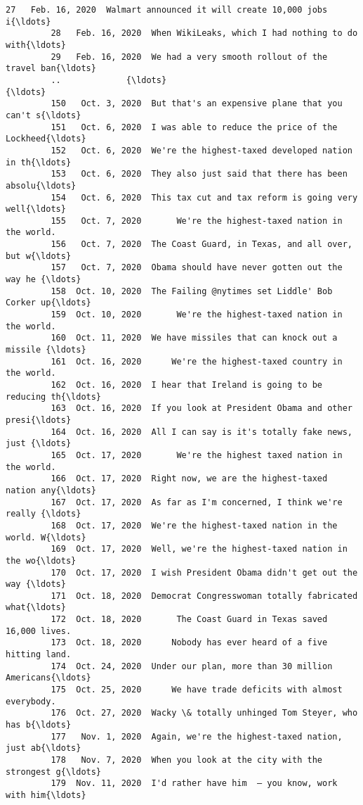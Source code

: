 \documentclass[11pt]{article}
\begin{document}
\begin{Verbatim}[commandchars=\\\{\}]
         27   Feb. 16, 2020  Walmart announced it will create 10,000 jobs i{\ldots}   
         28   Feb. 16, 2020  When WikiLeaks, which I had nothing to do with{\ldots}   
         29   Feb. 16, 2020  We had a very smooth rollout of the travel ban{\ldots}   
         ..             {\ldots}                                                {\ldots}   
         150   Oct. 3, 2020  But that's an expensive plane that you can't s{\ldots}   
         151   Oct. 6, 2020  I was able to reduce the price of the Lockheed{\ldots}   
         152   Oct. 6, 2020  We're the highest-taxed developed nation in th{\ldots}   
         153   Oct. 6, 2020  They also just said that there has been absolu{\ldots}   
         154   Oct. 6, 2020  This tax cut and tax reform is going very well{\ldots}   
         155   Oct. 7, 2020       We're the highest-taxed nation in the world.   
         156   Oct. 7, 2020  The Coast Guard, in Texas, and all over, but w{\ldots}   
         157   Oct. 7, 2020  Obama should have never gotten out the way he {\ldots}   
         158  Oct. 10, 2020  The Failing @nytimes set Liddle' Bob Corker up{\ldots}   
         159  Oct. 10, 2020       We're the highest-taxed nation in the world.   
         160  Oct. 11, 2020  We have missiles that can knock out a missile {\ldots}   
         161  Oct. 16, 2020      We're the highest-taxed country in the world.   
         162  Oct. 16, 2020  I hear that Ireland is going to be reducing th{\ldots}   
         163  Oct. 16, 2020  If you look at President Obama and other presi{\ldots}   
         164  Oct. 16, 2020  All I can say is it's totally fake news, just {\ldots}   
         165  Oct. 17, 2020       We're the highest taxed nation in the world.   
         166  Oct. 17, 2020  Right now, we are the highest-taxed nation any{\ldots}   
         167  Oct. 17, 2020  As far as I'm concerned, I think we're really {\ldots}   
         168  Oct. 17, 2020  We're the highest-taxed nation in the world. W{\ldots}   
         169  Oct. 17, 2020  Well, we're the highest-taxed nation in the wo{\ldots}   
         170  Oct. 17, 2020  I wish President Obama didn't get out the way {\ldots}   
         171  Oct. 18, 2020  Democrat Congresswoman totally fabricated what{\ldots}   
         172  Oct. 18, 2020       The Coast Guard in Texas saved 16,000 lives.   
         173  Oct. 18, 2020      Nobody has ever heard of a five hitting land.   
         174  Oct. 24, 2020  Under our plan, more than 30 million Americans{\ldots}   
         175  Oct. 25, 2020      We have trade deficits with almost everybody.   
         176  Oct. 27, 2020  Wacky \& totally unhinged Tom Steyer, who has b{\ldots}   
         177   Nov. 1, 2020  Again, we're the highest-taxed nation, just ab{\ldots}   
         178   Nov. 7, 2020  When you look at the city with the strongest g{\ldots}   
         179  Nov. 11, 2020  I'd rather have him  – you know, work with him{\ldots}   
         

\end{Verbatim}
\end{document}

